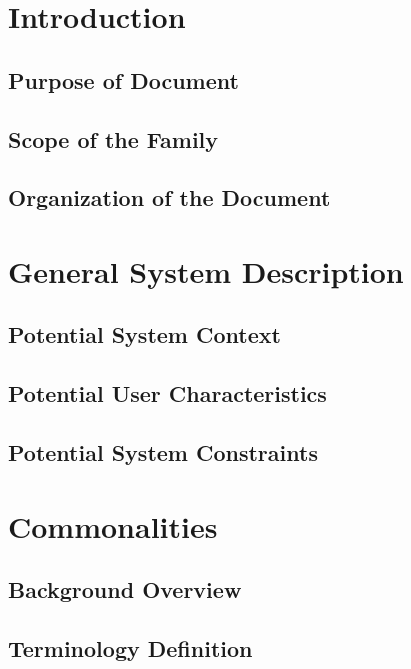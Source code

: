 \documentclass{article}
\begin{document}
\newpage

\section{Introduction}

\subsection{Purpose of Document}


\subsection{Scope of the Family} \label{Sec_Scope}

 
\subsection{Organization of the Document}


\section{General System Description} \label{Sec_GenSystDescript}


\subsection{Potential System Context}


\subsection{Potential User Characteristics}

\subsection{Potential System Constraints}

\section{Commonalities} \label{Sec_Commonalities}

\subsection{Background Overview}

\subsection{Terminology Definition} \label{Sec_TerminologyDef}
\end{document}
